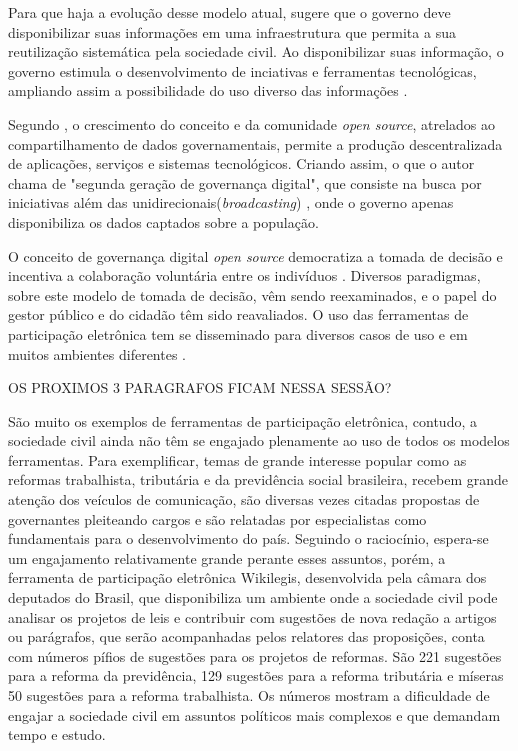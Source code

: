 \par
Para que haja a evolução desse modelo atual,  sugere que o governo deve disponibilizar suas informações em uma infraestrutura que permita
a sua reutilização sistemática pela sociedade civil. Ao disponibilizar suas informação, o governo estimula o desenvolvimento de inciativas e ferramentas tecnológicas,
ampliando assim a possibilidade do uso diverso das informações \cite{zuiderwijk2012socio}.

\par
Segundo , o crescimento do conceito e da comunidade \textit{open source}, atrelados ao compartilhamento de dados governamentais,
permite a produção descentralizada de aplicações, serviços e sistemas tecnológicos. Criando assim, o que o autor chama de "segunda geração de governança digital", 
que consiste na busca por iniciativas além das unidirecionais(\textit{broadcasting}) , onde o governo apenas disponibiliza os dados captados sobre a população.

\par
O conceito de governança digital \textit{open source} democratiza a tomada de decisão e incentiva a colaboração voluntária entre os indivíduos \cite{rushkoff2003open}.
Diversos paradigmas, sobre este modelo de tomada de decisão, vêm sendo reexaminados, e o papel do gestor público e do cidadão têm sido reavaliados.
O uso das ferramentas de participação eletrônica tem se disseminado para diversos casos de uso e em muitos ambientes diferentes \cite{medeiros2009novos}.


OS PROXIMOS 3 PARAGRAFOS FICAM NESSA SESSÃO?


\par
São muito os exemplos de ferramentas de participação eletrônica, contudo, a sociedade civil ainda não têm se engajado plenamente ao uso de todos os modelos ferramentas.
Para exemplificar, temas de grande interesse popular como as reformas trabalhista, tributária e da previdência social brasileira, recebem grande atenção dos 
veículos de comunicação, são diversas vezes citadas propostas de governantes pleiteando cargos e são relatadas por especialistas como fundamentais para o desenvolvimento do país.
Seguindo o raciocínio, espera-se um engajamento relativamente grande perante esses assuntos, porém, a ferramenta de participação eletrônica Wikilegis, desenvolvida pela câmara
dos deputados do Brasil, que disponibiliza um ambiente onde a sociedade civil pode analisar os projetos de leis e contribuir com sugestões
de nova redação a artigos ou parágrafos, que serão acompanhadas pelos relatores das proposições, conta com números pífios de sugestões para os projetos de reformas.
São 221 sugestões para a reforma da previdência, 129 sugestões para a reforma tributária e míseras 50 sugestões para a reforma trabalhista. 
Os números mostram a dificuldade de engajar a sociedade civil em assuntos políticos mais complexos e que demandam tempo e estudo.

